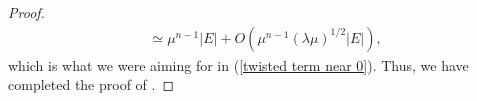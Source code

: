\documentclass[10pt,a4paper]{amsart}
\begin{document}
\begin{proof}
\begin{equation*}
\begin{split}
        & \simeq \mu^{n-1} |E| +  O (  \mu^{n-1} (\lambda \mu)^{1/2} |E|),
    \end{split}
\end{equation*}
which is what we were aiming for in (\ref{twisted term near 0}). Thus, we have completed the proof of .
\end{proof}
\end{document}

